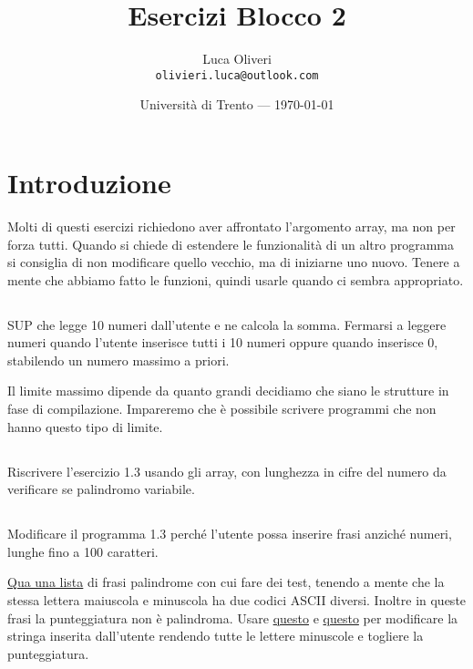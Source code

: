 \documentclass{article}
\title{Esercizi Blocco 2} %
\author{Luca Oliveri\\ \texttt{olivieri.luca@outlook.com}} %
\date{Università di Trento --- \today} %
\begin{document}
\maketitle %

\section*{Introduzione} %
Molti di questi esercizi richiedono aver affrontato l'argomento array, ma non per forza tutti. Quando si chiede di estendere le funzionalità di un altro programma si consiglia di non modificare quello vecchio, ma di iniziarne uno nuovo. Tenere a mente che abbiamo fatto le funzioni, quindi usarle quando ci sembra appropriato.

\setcounter{section}{2}


\subsection{}
SUP che legge 10 numeri dall'utente e ne calcola la somma. Fermarsi a leggere numeri quando l'utente inserisce tutti i 10 numeri oppure quando inserisce 0, stabilendo un numero massimo a priori.
\begin{info} 
	Il limite massimo dipende da quanto grandi decidiamo che siano le strutture in fase di compilazione. Impareremo che è possibile scrivere programmi che non hanno questo tipo di limite.
\end{info}

\subsection{}
Riscrivere l'esercizio 1.3 usando gli array, con lunghezza in cifre del numero da verificare se palindromo variabile.

\subsection{}
Modificare il programma 1.3 perché l'utente possa inserire frasi anziché numeri, lunghe fino a 100 caratteri. 
\begin{info}
	\href{https://www2.cs.arizona.edu/icon/oddsends/palinsen.htm}{Qua una lista} di frasi palindrome con cui fare dei test, tenendo a mente che la stessa lettera maiuscola e minuscola ha due codici ASCII diversi. Inoltre in queste frasi la punteggiatura non è palindroma. Usare \href{http://www.cplusplus.com/reference/cctype/tolower/}{questo} e \href{http://www.cplusplus.com/reference/cctype/ispunct/}{questo} per modificare la stringa inserita dall'utente rendendo tutte le lettere minuscole e togliere la punteggiatura.
\end{info}
\end{document}
